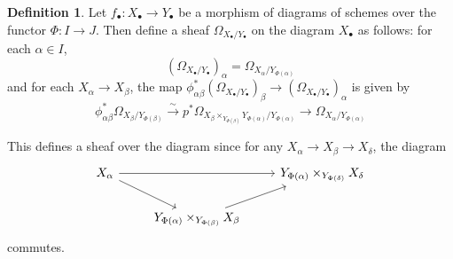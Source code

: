 \documentclass{amsart}
\theoremstyle{definition}
\newtheorem{definition}[theorem]{Definition}
\begin{document}
\begin{definition}
	Let $f_\bullet : X_\bullet \rightarrow Y_\bullet$ be a morphism of diagrams of schemes over the functor $\Phi : I \rightarrow J$.
	Then define a sheaf $\Omega_{X_\bullet / Y_\bullet}$ on the diagram $X_\bullet$ as follows: for each $\alpha \in I$,
	\[
		(\Omega_{X_\bullet / Y_\bullet})_\alpha = \Omega_{X_\alpha / Y_{\Phi(\alpha)}}
	\]
	and for each $X_\alpha \rightarrow X_\beta$, the map $\phi_{\alpha \beta}^* (\Omega_{X_\bullet / Y_\bullet})_\beta \rightarrow (\Omega_{X_\bullet / Y_\bullet})_\alpha$ is given by
	\[
		\phi_{\alpha \beta}^* \Omega_{X_\beta / Y_{\Phi(\beta)}} \xrightarrow{\sim} p^* \Omega_{X_\beta \times_{Y_{\Phi(\beta)}} Y_{\Phi(\alpha)} / Y_{\Phi(\alpha)}} \rightarrow \Omega_{X_\alpha / Y_{\Phi(\alpha)}}
	\]
	
	This defines a sheaf over the diagram since for any $X_\alpha \rightarrow X_\beta \rightarrow X_\delta$, the diagram
	\[
		\begin{tikzcd}
			X_\alpha \arrow{rr} \arrow{dr} & & Y_{\Phi(\alpha)} \times_{Y_{\Phi(\delta)}} X_\delta \\
			& Y_{\Phi(\alpha)} \times_{Y_{\Phi(\beta)}} X_\beta \arrow{ur} & {}
		\end{tikzcd}
	\]
	commutes.
\end{definition}

{}

\end{document}
